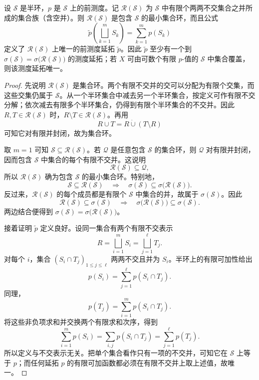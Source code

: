 \begin{theorem}
\label{b1:thm:semiring-extension}
设 \(\mathcal S\) 是半环，\(p\) 是 \(\mathcal S\) 上的前测度。记 \(\mathcal R(\mathcal S)\) 为 \(\mathcal S\) 中有限个两两不交集合之并所成的集合族（含空并）。则 \(\mathcal R(\mathcal S)\) 是包含 \(\mathcal S\) 的最小集合环，而且公式
\[
\widetilde p\left(\bigsqcup_{k=1}^{m}S_k\right)
=\sum_{k=1}^{m}p(S_k)
\]
定义了 \(\mathcal R(\mathcal S)\) 上唯一的前测度延拓 \(\widetilde p\)。因此 \(\widetilde p\) 至少有一个到 \(\sigma(\mathcal S)=\sigma\bigl(\mathcal R(\mathcal S)\bigr)\) 的测度延拓；若 \(X\) 可由可数个有限 \(p\)-值的 \(\mathcal S\) 中集合覆盖，则该测度延拓唯一。
\end{theorem}
\begin{proof}
先说明 \(\mathcal R(\mathcal S)\) 是集合环。两个有限不交并的交可以分配为有限个交集，而这些交集仍属于 \(\mathcal S\)。从一个半环集合中减去另一个半环集合，按定义可作有限不交分解；依次减去有限多个半环集合，仍得到有限个半环集合的不交并。因此 \(R,T\in\mathcal R(\mathcal S)\) 时，\(R\setminus T\in\mathcal R(\mathcal S)\)。再用
\[
R\cup T=R\mathbin{\dot\cup}(T\setminus R)
\]
可知它对有限并封闭，故为集合环。

取 \(m=1\) 可知 \(\mathcal S\subseteq\mathcal R(\mathcal S)\)。若 \(\mathcal Q\) 是任意包含 \(\mathcal S\) 的集合环，则 \(\mathcal Q\) 对有限并封闭，因而包含 \(\mathcal S\) 中集合的每个有限不交并。这说明
\[
\mathcal R(\mathcal S)\subseteq\mathcal Q,
\]
所以 \(\mathcal R(\mathcal S)\) 确为包含 \(\mathcal S\) 的最小集合环。特别地，
\[
\mathcal S\subseteq\mathcal R(\mathcal S)
\quad\Longrightarrow\quad
\sigma(\mathcal S)\subseteq\sigma\bigl(\mathcal R(\mathcal S)\bigr).
\]
反过来，\(\mathcal R(\mathcal S)\) 的每个成员都是有限个 \(\mathcal S\) 中集合的并，故属于 \(\sigma(\mathcal S)\)。因此
\[
\mathcal R(\mathcal S)\subseteq\sigma(\mathcal S)
\quad\Longrightarrow\quad
\sigma\bigl(\mathcal R(\mathcal S)\bigr)\subseteq\sigma(\mathcal S).
\]
两边结合便得到
\(
\sigma(\mathcal S)=\sigma\bigl(\mathcal R(\mathcal S)\bigr)
\)。

接着证明 \(\widetilde p\) 定义良好。设同一集合有两个有限不交表示
\[
R=\bigsqcup_{i=1}^{m}S_i
=\bigsqcup_{j=1}^{\ell}T_j.
\]
对每个 \(i\)，集合 \((S_i\cap T_j)_{1\leq j\leq\ell}\) 两两不交且并为 \(S_i\)。半环上的有限可加性给出
\[
p(S_i)=\sum_{j=1}^{\ell}p(S_i\cap T_j).
\]
同理，
\[
p(T_j)=\sum_{i=1}^{m}p(S_i\cap T_j).
\]
将这些非负项求和并交换两个有限求和次序，得到
\[
\sum_{i=1}^{m}p(S_i)
=\sum_{i,j}p(S_i\cap T_j)
=\sum_{j=1}^{\ell}p(T_j).
\]
所以定义与不交表示无关。把单个集合看作只有一项的不交并，可知它在 \(\mathcal S\) 上等于 \(p\)；而任何延拓 \(p\) 的有限可加函数都必须在有限不交并上取上述值，故唯一。


\end{proof}
